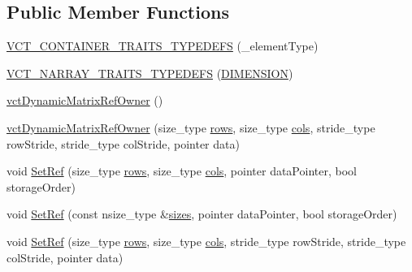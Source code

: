 \subsection*{Public Member Functions}
\begin{DoxyCompactItemize}
\item 
\hyperlink{classvct_dynamic_matrix_ref_owner_a9ae62111eb791881df77724acf6f770a}{V\-C\-T\-\_\-\-C\-O\-N\-T\-A\-I\-N\-E\-R\-\_\-\-T\-R\-A\-I\-T\-S\-\_\-\-T\-Y\-P\-E\-D\-E\-F\-S} (\-\_\-element\-Type)
\item 
\hyperlink{classvct_dynamic_matrix_ref_owner_a43dcc8472acb28d89bb73f464a7b8b99}{V\-C\-T\-\_\-\-N\-A\-R\-R\-A\-Y\-\_\-\-T\-R\-A\-I\-T\-S\-\_\-\-T\-Y\-P\-E\-D\-E\-F\-S} (\hyperlink{classvct_dynamic_matrix_ref_owner_af13d59ea37e2deaafd66ed04d22db916ae19d71a7e9eb96879fbbe0b8acea6fae}{D\-I\-M\-E\-N\-S\-I\-O\-N})
\item 
\hyperlink{classvct_dynamic_matrix_ref_owner_a72f01614f9be39f058c620d408210e41}{vct\-Dynamic\-Matrix\-Ref\-Owner} ()
\item 
\hyperlink{classvct_dynamic_matrix_ref_owner_a8a1de6a902b35030fb153200ae6b22dd}{vct\-Dynamic\-Matrix\-Ref\-Owner} (size\-\_\-type \hyperlink{classvct_dynamic_matrix_ref_owner_a71161877fb7c5ee68659182330398d0c}{rows}, size\-\_\-type \hyperlink{classvct_dynamic_matrix_ref_owner_a99f7f47110e3cfbef58a7274f5a4a9d8}{cols}, stride\-\_\-type row\-Stride, stride\-\_\-type col\-Stride, pointer data)
\item 
void \hyperlink{classvct_dynamic_matrix_ref_owner_adbdbbfeca6dbafd808e4b809658e9e6f}{Set\-Ref} (size\-\_\-type \hyperlink{classvct_dynamic_matrix_ref_owner_a71161877fb7c5ee68659182330398d0c}{rows}, size\-\_\-type \hyperlink{classvct_dynamic_matrix_ref_owner_a99f7f47110e3cfbef58a7274f5a4a9d8}{cols}, pointer data\-Pointer, bool storage\-Order)
\item 
void \hyperlink{classvct_dynamic_matrix_ref_owner_a0843b98e9fa0d75666fd750c0803b27a}{Set\-Ref} (const nsize\-\_\-type \&\hyperlink{classvct_dynamic_matrix_ref_owner_a24eabc5446686143d16cd34d777afe14}{sizes}, pointer data\-Pointer, bool storage\-Order)
\item 
void \hyperlink{classvct_dynamic_matrix_ref_owner_a9ea969a75fe8ff5f44127353b6e49a68}{Set\-Ref} (size\-\_\-type \hyperlink{classvct_dynamic_matrix_ref_owner_a71161877fb7c5ee68659182330398d0c}{rows}, size\-\_\-type \hyperlink{classvct_dynamic_matrix_ref_owner_a99f7f47110e3cfbef58a7274f5a4a9d8}{cols}, stride\-\_\-type row\-Stride, stride\-\_\-type col\-Stride, pointer data)
\item 

\end{DoxyCompactItemize}
